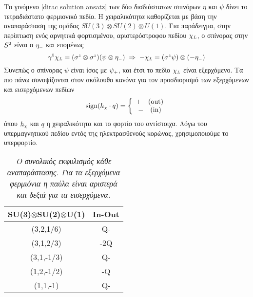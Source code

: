 Το γινόμενο \eqref{dirac solution ansatz} των δύο δισδιάστατων σπινόρων $\eta$ και $\psi$ δίνει το τετραδιάστατο φερμιονικό πεδίο. Η χειραλικότητα καθορίζεται με βάση την αναπαράσταση της ομάδας $SU(3)\otimes SU(2)\otimes U(1)$. 
Για παράδειγμα, στην περίπτωση ενός αρνητικά φορτισμένου, αριστερόστροφου πεδίου $\chi\subscr{L}$, ο σπίνορας στην $S\superscr{2}$ είναι ο $\eta\subscr{-}$ και επομένως
\begin{equation}
    \gamma\superscr{5}\chi\subscr{L}=(\sigma\superscr{z}\otimes\sigma\superscr{z})(\psi\otimes\eta\subscr{-})\;\Rightarrow\;-\chi\subscr{L}=(\sigma\superscr{z}\psi)\otimes(-\eta\subscr{-})
\end{equation}
Συνεπώς ο σπίνορας $\psi$ είναι ίσος με $\psi\subscr{+}$, και έτσι το πεδίο $\chi\subscr{L}$ είναι εξερχόμενο. 
Τα πιο πάνω συνοψίζονται στον ακόλουθο κανόνα για τον προσδιορισμό των εξερχόμενων και εισερχόμενων πεδίων
\begin{equation}\label{rule for out in fields}
    \text{sign}(h\subscr{\chi}\cdot q) =\left\{\begin{array}{c} +\quad (\text{out})\\ -\quad (\text{in})\end{array}\right.
\end{equation}
όπου $h\subscr{\chi}$ και $q$ η χειραλικότητα 
και το φορτίο του αντίστοιχα. Λόγω του υπερμαγνητικού πεδίου εντός της ηλεκτρασθενούς κορώνας, χρησιμοποιούμε το υπερφορτίο.

\begin{table}[t]
    \centering
    \begin{tabular}{|c|c|}
    \hline
    SU(3)$\otimes$SU(2)$\otimes$U(1) & In-Out\\
    \hline
    (3,2,1/6)&Q-\\
    \hline
    (3,1,2/3)&-2Q\\
    \hline
    (3,1,-1/3)&Q-\\
    \hline
    (1,2,-1/2)&-Q\\
    \hline
    (1,1,-1)&Q-\\
    \hline
    \end{tabular}
    \caption{\textit{Ο συνολικός εκφυλισμός κάθε αναπαράστασης. Για τα εξερχόμενα φερμιόνια η παύλα είναι αριστερά και δεξιά για τα εισερχόμενα.}}
    \label{table: out-in fields and degeneracy for each representation}
\end{table}

